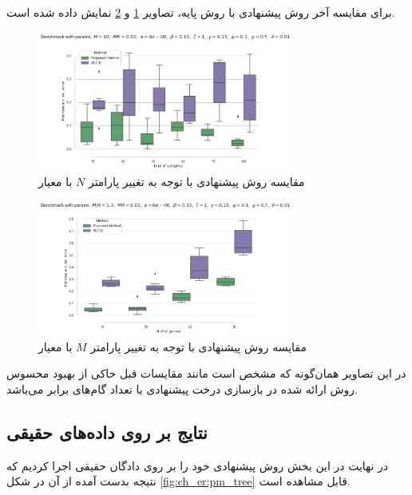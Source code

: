 برای مقایسه آخر روش پیشنهادی با روش پایه، تصاویر  \ref{fig:ch_er:comp_change_N_pwa} و \ref{fig:ch_er:comp_change_M_pwa} نمایش داده شده است.
\begin{figure}[!ht]
	\centering
	\includegraphics[width=0.75\textwidth]{img/chaps/er/comp_change_N_pwa}
	\caption{‌مقایسه روش پیشنهادی با توجه به تغییر پارامتر 
		$N$ با معیار }
	\label{fig:ch_er:comp_change_N_pwa}
\end{figure}
\begin{figure}[!ht]
	\centering
	\includegraphics[width=0.75\textwidth]{img/chaps/er/comp_change_M_pwa}
	\caption{‌مقایسه روش پیشنهادی با توجه به تغییر پارامتر
		$M$ با معیار }
	\label{fig:ch_er:comp_change_M_pwa}
\end{figure}
در این تصاویر همان‌گونه که مشخص است مانند مقایسات قبل حاکی از بهبود محسوس روش ارائه شده در بازسازی درخت پیشنهادی با تعداد گام‌های برابر می‌باشد.


\subsection{نتایج بر روی داده‌های حقیقی}
در نهایت در این بخش روش پیشنهادی خود را بر روی دادگان حقیقی \cite{davis2016computing} اجرا کردیم که نتیجه بدست آمده از آن در شکل \ref{fig:ch_er:pm_tree} قابل مشاهده است.


